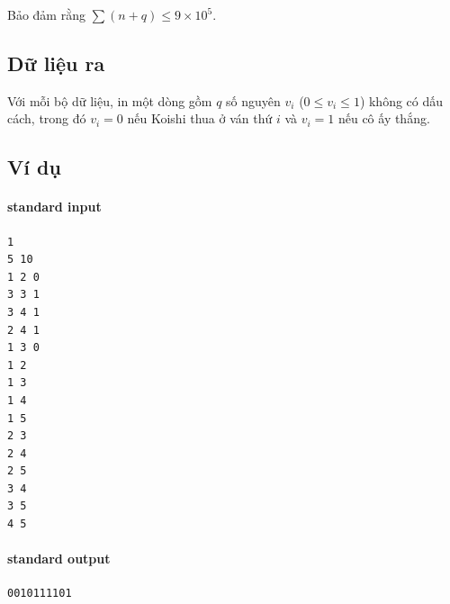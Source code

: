 \documentclass[11pt]{article}
\begin{document}
Bảo đảm rằng \(\sum (n+q)\le 9\times 10^5\).

\subsection*{Dữ liệu ra}

Với mỗi bộ dữ liệu, in một dòng gồm \(q\) số nguyên \(v_i\) (\(0\le v_i\le
1\)) không có dấu cách, trong đó \(v_i=0\) nếu Koishi thua ở ván thứ \(i\) và
\(v_i=1\) nếu cô ấy thắng.

\subsection*{Ví dụ}

\paragraph{standard input}
\begin{verbatim}
1
5 10
1 2 0
3 3 1
3 4 1
2 4 1
1 3 0
1 2
1 3
1 4
1 5
2 3
2 4
2 5
3 4
3 5
4 5
\end{verbatim}

\paragraph{standard output}
\begin{verbatim}
0010111101
\end{verbatim}
\end{document}
